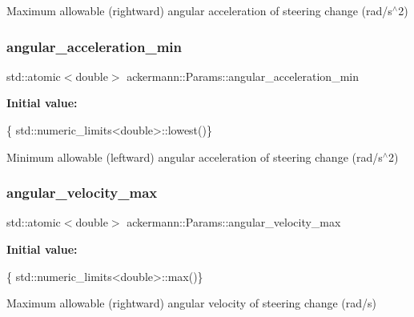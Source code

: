 Maximum allowable (rightward) angular acceleration of steering change (rad/s$^\wedge$2) 

\mbox{\label{structackermann_1_1_params_a5baf993ebf740d79eeb1e19e041ceb8e}} 
\subsubsection{\texorpdfstring{angular\+\_\+acceleration\+\_\+min}{angular\_acceleration\_min}}
{\footnotesize\ttfamily std\+::atomic$<$double$>$ ackermann\+::\+Params\+::angular\+\_\+acceleration\+\_\+min}

{\bfseries Initial value\+:}
\begin{DoxyCode}
\{
    std::numeric\_limits<double>::lowest()\}
\end{DoxyCode}


Minimum allowable (leftward) angular acceleration of steering change (rad/s$^\wedge$2) 

\mbox{\label{structackermann_1_1_params_aad93f5ef58bf87db04c9e21f3c1067ca}} 
\subsubsection{\texorpdfstring{angular\+\_\+velocity\+\_\+max}{angular\_velocity\_max}}
{\footnotesize\ttfamily std\+::atomic$<$double$>$ ackermann\+::\+Params\+::angular\+\_\+velocity\+\_\+max}

{\bfseries Initial value\+:}
\begin{DoxyCode}
\{
    std::numeric\_limits<double>::max()\}
\end{DoxyCode}


Maximum allowable (rightward) angular velocity of steering change (rad/s) 

\mbox{\label{structackermann_1_1_params_a20071280825a5dfdf0eba12fa45c6886}} 

